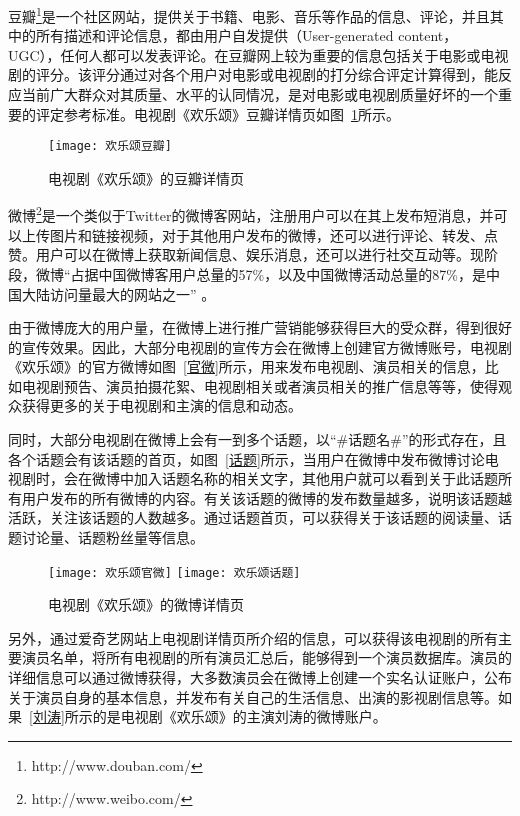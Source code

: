 豆瓣\footnote{http://www.douban.com/}是一个社区网站，提供关于书籍、电影、音乐等作品的信息、评论，并且其中的所有描述和评论信息，都由用户自发提供（User-generated content， UGC），任何人都可以发表评论。在豆瓣网上较为重要的信息包括关于电影或电视剧的评分。该评分通过对各个用户对电影或电视剧的打分综合评定计算得到，能反应当前广大群众对其质量、水平的认同情况，是对电影或电视剧质量好坏的一个重要的评定参考标准。电视剧《欢乐颂》豆瓣详情页如图~\ref{欢乐颂豆瓣}所示。

\begin{figure}[h] 
  \centering
  \texttt{[image: 欢乐颂豆瓣]}
  \caption{电视剧《欢乐颂》的豆瓣详情页}
  \label{欢乐颂豆瓣}
\end{figure}

微博\footnote{http://www.weibo.com/}是一个类似于Twitter的微博客网站，注册用户可以在其上发布短消息，并可以上传图片和链接视频，对于其他用户发布的微博，还可以进行评论、转发、点赞。用户可以在微博上获取新闻信息、娱乐消息，还可以进行社交互动等。现阶段，微博“占据中国微博客用户总量的57\%，以及中国微博活动总量的87\%，是中国大陆访问量最大的网站之一” \cite{微博维基}。

由于微博庞大的用户量，在微博上进行推广营销能够获得巨大的受众群，得到很好的宣传效果。因此，大部分电视剧的宣传方会在微博上创建官方微博账号，电视剧《欢乐颂》的官方微博如图~\ref{官微}所示，用来发布电视剧、演员相关的信息，比如电视剧预告、演员拍摄花絮、电视剧相关或者演员相关的推广信息等等，使得观众获得更多的关于电视剧和主演的信息和动态。

同时，大部分电视剧在微博上会有一到多个话题，以“\#话题名\#”的形式存在，且各个话题会有该话题的首页，如图~\ref{话题}所示，当用户在微博中发布微博讨论电视剧时，会在微博中加入话题名称的相关文字，其他用户就可以看到关于此话题所有用户发布的所有微博的内容。有关该话题的微博的发布数量越多，说明该话题越活跃，关注该话题的人数越多。通过话题首页，可以获得关于该话题的阅读量、话题讨论量、话题粉丝量等信息。

\begin{figure}[h]
  \centering%
    {\texttt{[image: 欢乐颂官微]}}
      {\texttt{[image: 欢乐颂话题]}}
  \caption{电视剧《欢乐颂》的微博详情页}
\end{figure}

另外，通过爱奇艺网站上电视剧详情页所介绍的信息，可以获得该电视剧的所有主要演员名单，将所有电视剧的所有演员汇总后，能够得到一个演员数据库。演员的详细信息可以通过微博获得，大多数演员会在微博上创建一个实名认证账户，公布关于演员自身的基本信息，并发布有关自己的生活信息、出演的影视剧信息等。如果~\ref{刘涛}所示的是电视剧《欢乐颂》的主演刘涛的微博账户。

